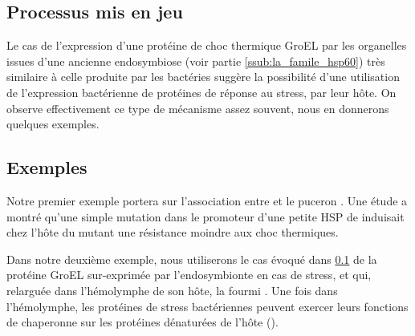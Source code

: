 
\subsection{Processus mis en jeu} %
\label{sub:processus_mis_en_jeu2}

Le cas de l'expression d'une protéine de choc thermique GroEL par les
organelles issues d'une ancienne endosymbiose (voir partie
\ref{ssub:la_famile_hsp60}) très similaire à celle produite par les bactéries
suggère la possibilité d'une utilisation de l'expression bactérienne de
protéines de réponse au stress, par leur hôte. On observe effectivement ce
type de mécanisme assez souvent, nous en donnerons quelques exemples.

\subsection{Exemples} %
\label{sub:exemples_genes_bactos}


Notre premier exemple portera sur l'association entre  et le
puceron . Une étude \cite{dunbar2007} a montré qu'une
simple mutation dans le promoteur d'une petite HSP de  induisait
chez l'hôte du mutant une résistance moindre aux choc thermiques.


Dans notre deuxième exemple, nous utiliserons le cas évoqué dans
\ref{sub:processus_mis_en_jeu2} de la protéine GroEL sur-exprimée par
l'endosymbionte  en cas de stress, et qui,
relarguée dans l'hémolymphe de son hôte, la fourmi .
Une fois dans l'hémolymphe, les protéines de stress bactériennes peuvent
exercer leurs fonctions de chaperonne sur les protéines dénaturées de l'hôte
(\cite{stoll2009}). 
